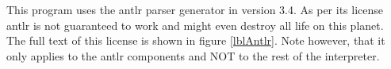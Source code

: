 This program uses the antlr parser generator in version 3.4. As per its license antlr is not guaranteed to work and might even destroy all life on this planet. The full text of this license is shown in figure \ref{lblAntlr}. Note however, that it only applies to the antlr components and NOT to the rest of the interpreter.




